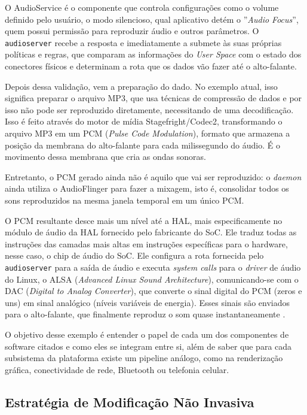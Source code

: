 \documentclass[
    12pt,
    openright,
    oneside,
    a4paper,
    english,
    brazilian
    ]{abntex2}
\begin{document}
O AudioService é o componente que controla configurações como o volume definido pelo usuário, o modo silencioso, qual aplicativo detém o ''\textit{Audio Focus}'', quem possui permissão para reproduzir áudio e outros parâmetros. O \texttt{audioserver} recebe a resposta e imediatamente a submete às suas próprias políticas e regras, que comparam as informações do \textit{User Space} com o estado dos conectores físicos e determinam a rota que os dados vão fazer até o alto-falante.

Depois dessa validação, vem a preparação do dado. No exemplo atual, isso significa preparar o arquivo MP3, que usa técnicas de compressão de dados e por isso não pode ser reproduzido diretamente, necessitando de uma decodificação. Isso é feito através do motor de mídia Stagefright/Codec2, transformando o arquivo MP3 em um PCM (\textit{Pulse Code Modulation}), formato que armazena a posição da membrana do alto-falante para cada milissegundo do áudio. É o movimento dessa membrana que cria as ondas sonoras.

Entretanto, o PCM gerado ainda não é aquilo que vai ser reproduzido: o \textit{daemon} ainda utiliza o AudioFlinger para fazer a mixagem, isto é, consolidar todos os sons reproduzidos na mesma janela temporal em um único PCM.

O PCM resultante desce mais um nível até a HAL, mais especificamente no módulo de áudio da HAL fornecido pelo fabricante do SoC. Ele traduz todas as instruções das camadas mais altas em instruções específicas para o hardware, nesse caso, o chip de áudio do SoC. Ele configura a rota fornecida pelo \texttt{audioserver} para a saída de áudio e executa \textit{system calls} para o \textit{driver} de áudio do Linux, o ALSA (\textit{Advanced Linux Sound Architecture}), comunicando-se com o DAC (\textit{Digital to Analog Converter}), que converte o sinal digital do PCM (zeros e uns) em sinal analógico (níveis variáveis de energia). Esses sinais são enviados para o alto-falante, que finalmente reproduz o som quase instantaneamente \cite{tanenbaum2016, android2025}.

O objetivo desse exemplo é entender o papel de cada um dos componentes de software citados e como eles se integram entre si, além de saber que para cada subsistema da plataforma existe um pipeline análogo, como na renderização gráfica, conectividade de rede, Bluetooth ou telefonia celular.

\subsection{Estratégia de Modificação Não Invasiva}
\end{document}
